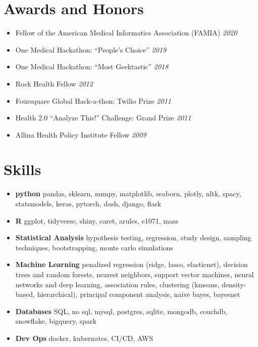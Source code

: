 \documentclass[11pt]{article}
\newcommand{\rside}[1]{
  \hfill {\itshape #1}%
}
\begin{document}
\section{Awards and Honors}
\begin{itemize}
    \renewcommand{\labelitemi}{}
    \setlength{\leftskip}{-1.5em}
    \item Fellow of the American Medical Informatics Association (FAMIA) \rside{2020}
    \item One Medical Hackathon: “People’s Choice” \rside{2019}
    \item One Medical Hackathon: “Most Geektastic” \rside{2018}
    \item Rock Health Fellow \rside{2012}
    \item Foursquare Global Hack-a-thon: Twilio Prize \rside{2011}
    \item Health 2.0 “Analyze This!” Challenge: Grand Prize \rside{2011}
    \item Allina Health Policy Institute Fellow \rside{2009}
\end{itemize}

\section{Skills}
\begin{itemize}
    \renewcommand{\labelitemi}{}
    \setlength{\leftskip}{-1.5em}
    \item \textbf{python} pandas, sklearn, numpy, matplotlib, seaborn, plotly, nltk, spacy, statsmodels, keras, pytorch, dash, django, flask
    \item \textbf{R} ggplot, tidyverse, shiny, caret, arules, e1071, mass
    \item \textbf{Statistical Analysis} hypothesis testing, regression, study design, sampling techniques, bootstrapping, monte carlo simulations
    \item \textbf{Machine Learning} penalized regression (ridge, lasso, elasticnet), decision trees and random forests, nearest neighbors, support vector machines, neural networks and deep learning, association rules, clustering (kmeans, density-based, hierarchical), principal component analysis, naive bayes, bayesnet
    \item \textbf{Databases} SQL, no sql, mysql, postgres, sqlite, mongodb, couchdb, snowflake, bigquery, spark
    \item \textbf{Dev Ops} docker, kubernates, CI/CD, AWS
\end{itemize}
\end{document}
